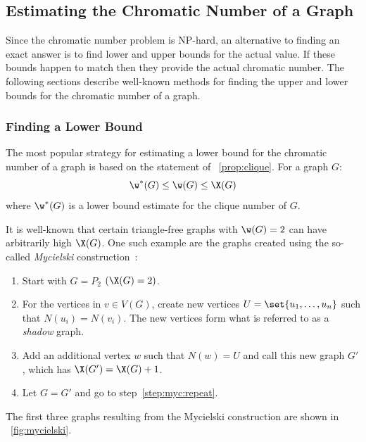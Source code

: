 \subsection{Estimating the Chromatic Number of a Graph}

Since the chromatic number problem is NP-hard, an alternative to finding an exact answer is to find lower and upper
bounds for the actual value.  If these bounds happen to match then they provide the actual chromatic number.  The
following sections describe well-known methods for finding the upper and lower bounds for the chromatic number of a
graph.

\subsubsection{Finding a Lower Bound}\label{sec:sub:sub:lower}

The most popular strategy for estimating a lower bound for the chromatic number of a graph is based on the
statement of \propname~\ref{prop:clique}.  For a graph \(G\):
\[\w^*(G)\le\w(G)\le\X(G)\]
where \(\w^*(G)\) is a lower bound estimate for the clique number of \(G\).

It is well-known that certain triangle-free graphs with \(\w(G)=2\) can have arbitrarily high \(\X(G)\).  One such
example are the graphs created using the so-called \emph{Mycielski} construction~\cite{west}:
\begin{enumerate}
\item Start with \(G=P_2\) \((\X(G)=2)\).
\item\label{step:myc:repeat} For the vertices in \(v\in V(G)\), create new vertices \(U=\set{u_1,\ldots,u_n}\) such
  that \(N(u_i)=N(v_i)\).  The new vertices form what is referred to as a \emph{shadow} graph.
\item Add an additional vertex \(w\) such that \(N(w)=U\) and call this new graph \(G'\), which has
  \(\X(G')=\X(G)+1\).
\item Let \(G=G'\) and go to step~\ref{step:myc:repeat}.
\end{enumerate}

The first three graphs resulting from the Mycielski construction are shown in \figurename~\ref{fig:mycielski}.

